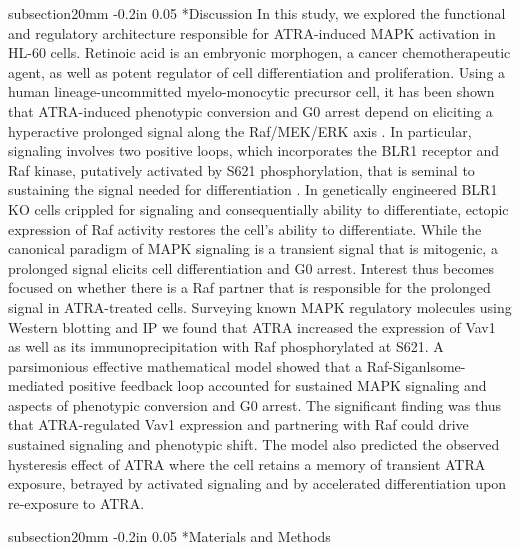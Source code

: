 \documentclass[12pt]{article}
\makeatletter
\renewcommand\section{\@startsection
	{subsection}{2}{0mm}
	{-0.2in}
	{0.05\baselineskip}
	{\normalfont\large\bfseries}}
\makeatother
\begin{document}
\clearpage

\section*{Discussion}
In this study, we explored the functional and regulatory architecture responsible for ATRA-induced MAPK activation in HL-60 cells.
Retinoic acid is an embryonic morphogen, a cancer chemotherapeutic agent, as well as potent regulator of cell differentiation and proliferation. 
Using a human lineage-uncommitted myelo-monocytic precursor cell, 
it has been shown that ATRA-induced phenotypic conversion and G0 arrest depend on eliciting a hyperactive prolonged signal along the Raf/MEK/ERK axis \cite{Yen1998}. 
In particular, signaling involves two positive loops, which incorporates the BLR1 receptor and Raf kinase, putatively activated by S621 phosphorylation, 
that is seminal to sustaining the signal needed for differentiation \cite{Wang2008}. 
In genetically engineered BLR1 KO cells crippled for signaling and consequentially ability to differentiate, ectopic expression of Raf activity restores the cell's ability to differentiate. 
While the canonical paradigm of MAPK signaling is a transient signal that is mitogenic, a prolonged signal elicits cell differentiation and G0 arrest. 
Interest thus becomes focused on whether there is a Raf partner that is responsible for the prolonged signal in ATRA-treated cells. 
Surveying known MAPK regulatory molecules using Western blotting and IP we found that ATRA increased the expression of Vav1 as well as its immunoprecipitation with Raf phosphorylated at S621. 
A parsimonious effective mathematical model showed that a Raf-Siganlsome-mediated positive feedback loop accounted for sustained MAPK signaling and aspects of phenotypic conversion and G0 arrest. 
The significant finding was thus that ATRA-regulated Vav1 expression and partnering with Raf could drive sustained signaling and phenotypic shift. The model also predicted the observed hysteresis effect of ATRA where the cell retains a memory of transient ATRA exposure, betrayed by activated signaling and by accelerated differentiation upon re-exposure to ATRA.

\clearpage

\section*{Materials and Methods}
\end{document}
